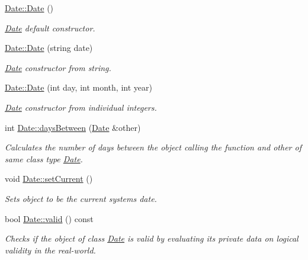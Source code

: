\begin{DoxyCompactItemize}
\item 
\mbox{\label{group___date_ga4e59ed4ba66eec61c27460c5d09fa1bd}} 
\hyperlink{group___date_ga4e59ed4ba66eec61c27460c5d09fa1bd}{Date\+::\+Date} ()
\begin{DoxyCompactList}\small\item\em \hyperlink{class_date}{Date} default constructor. \end{DoxyCompactList}\item 
\hyperlink{group___date_ga5532efafed41fd5f8e013a61313200dc}{Date\+::\+Date} (string date)
\begin{DoxyCompactList}\small\item\em \hyperlink{class_date}{Date} constructor from string. \end{DoxyCompactList}\item 
\hyperlink{group___date_gab1ad19969fa570605a6b0cd32b0da822}{Date\+::\+Date} (int day, int month, int year)
\begin{DoxyCompactList}\small\item\em \hyperlink{class_date}{Date} constructor from individual integers. \end{DoxyCompactList}\item 
int \hyperlink{group___date_ga9168133cb290c4f378699037ef7b5d4a}{Date\+::days\+Between} (\hyperlink{class_date}{Date} \&other)
\begin{DoxyCompactList}\small\item\em Calculates the number of days between the object calling the function and other of same class type \hyperlink{class_date}{Date}. \end{DoxyCompactList}\item 
\mbox{\label{group___date_gac47ebbacb1a76c4e7c1f55ca9072a640}} 
void \hyperlink{group___date_gac47ebbacb1a76c4e7c1f55ca9072a640}{Date\+::set\+Current} ()
\begin{DoxyCompactList}\small\item\em Sets object to be the current system\textquotesingle{}s date. \end{DoxyCompactList}\item 
bool \hyperlink{group___date_gac7a8c7b77f99b162a931199464c1bedc}{Date\+::valid} () const
\begin{DoxyCompactList}\small\item\em Checks if the object of class \hyperlink{class_date}{Date} is valid by evaluating it\textquotesingle{}s private data on logical validity in the real-\/world. \end{DoxyCompactList}\item 

\end{DoxyCompactItemize}
